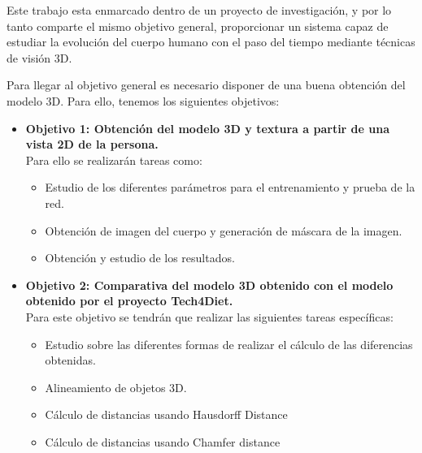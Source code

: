 
Este trabajo esta enmarcado dentro de un proyecto de investigación, y por lo tanto comparte el mismo objetivo general, proporcionar un sistema capaz de estudiar la evolución del cuerpo humano con el paso del tiempo mediante técnicas de visión 3D. 

Para llegar al objetivo general es necesario disponer de una buena obtención del modelo 3D. Para ello, tenemos los siguientes objetivos:


\begin{itemize}
	\item{\textbf{Objetivo 1: Obtención del modelo 3D y textura a partir de una vista 2D de la persona.}} 
	\\Para ello se realizarán tareas como:
	\begin{itemize}
		\item Estudio de los diferentes parámetros para el entrenamiento y prueba de la red.
		\item Obtención de imagen del cuerpo y generación de máscara de la imagen.
		\item Obtención y estudio de los resultados.
		
		
	\end{itemize}
	\item{\textbf{Objetivo 2: Comparativa del modelo 3D obtenido con el modelo obtenido por el proyecto Tech4Diet. }} \\
	Para este objetivo se tendrán que realizar las siguientes tareas específicas:
	\begin{itemize}
		\item Estudio sobre las diferentes formas de realizar el cálculo de las diferencias obtenidas.
		\item Alineamiento de objetos 3D.
		\item Cálculo de distancias usando Hausdorff Distance
		\item Cálculo de distancias usando Chamfer distance
	\end{itemize}
\end{itemize}

\label{sec:Introducción}

